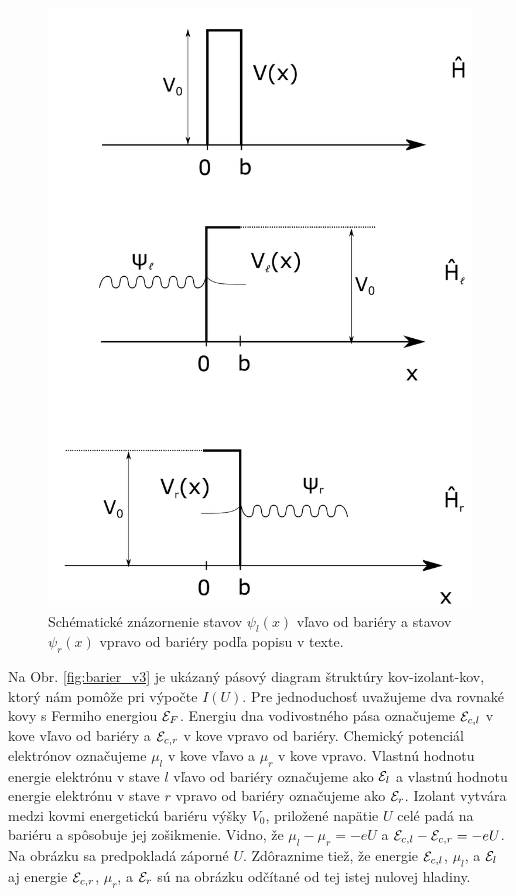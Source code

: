 \begin{figure}
        \centering
        \includegraphics[origin=c,scale=0.5]{grafy/3bariers}
        \caption{Schématické znázornenie stavov $\psi_{l}(x)$ vľavo od bariéry a stavov $\psi_{r}(x)$ vpravo od bariéry podľa popisu v texte.}
        \label{fig:3bariers}
    \end{figure}
Na Obr. \eqref{fig:barier_v3}  je ukázaný pásový diagram štruktúry kov-izolant-kov, ktorý nám pomôže pri výpočte $I(U)$. Pre jednoduchosť uvažujeme dva rovnaké kovy s Fermiho energiou $\mathcal{E}_{F}$.
Energiu dna vodivostného pása označujeme $\mathcal{E}_{c,l}$ v kove vľavo od bariéry a $\mathcal{E}_{c,r}$ v kove vpravo od bariéry. Chemický potenciál elektrónov označujeme $\mu_{l}$ v kove vľavo a $\mu_{r}$ v kove vpravo.
Vlastnú hodnotu energie elektrónu v stave $l$ vľavo od bariéry označujeme ako $\mathcal{E}_{l}$ a vlastnú hodnotu energie elektrónu v stave $r$ vpravo od bariéry označujeme ako $\mathcal{E}_{r}$.  Izolant vytvára medzi kovmi energetickú bariéru výšky $V_{0}$, priložené napätie $U$ celé padá na bariéru a spôsobuje jej zošikmenie. Vidno, že $\mu_{l} - \mu_{r} = -eU$ a $\mathcal{E}_{c,l}  - \mathcal{E}_{c,r} = -eU$. Na obrázku sa predpokladá záporné $U$. Zdôraznime tiež, že energie $\mathcal{E}_{c,l}$, $\mu_{l}$,  a $\mathcal{E}_{l}$ aj energie $\mathcal{E}_{c,r}$, $\mu_{r}$,  a $\mathcal{E}_{r}$ sú na obrázku odčítané od tej istej nulovej hladiny.

